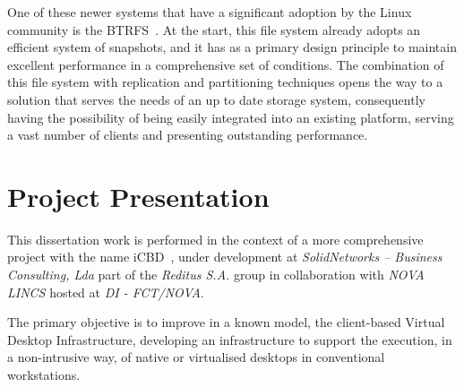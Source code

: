 
One of these newer systems that have a significant adoption by the Linux community is the BTRFS~\cite{Rodeh2013}. At the start, this file system already adopts an efficient system of snapshots, and it has as a primary design principle to maintain excellent performance in a comprehensive set of conditions.
The combination of this file system with replication and partitioning techniques opens the way to a solution that serves the needs of an up to date storage system, consequently having the possibility of being easily integrated into an existing platform, serving a vast number of clients and presenting outstanding performance. 



\section{Project Presentation} %
\label{sec:intro_project_presentation}

This dissertation work is performed in the context of a more comprehensive project with the name \gls{iCBD}~\cite{Lopes2017}, under development at \textit{SolidNetworks – Business Consulting, Lda} part of the \textit{Reditus S.A.} group in collaboration with \textit{NOVA LINCS} hosted at \textit{DI - FCT/NOVA}.

The primary objective is to improve in a known model, the client-based Virtual Desktop Infrastructure, developing an infrastructure to support the execution, in a non-intrusive way, of native or virtualised desktops in conventional workstations.


